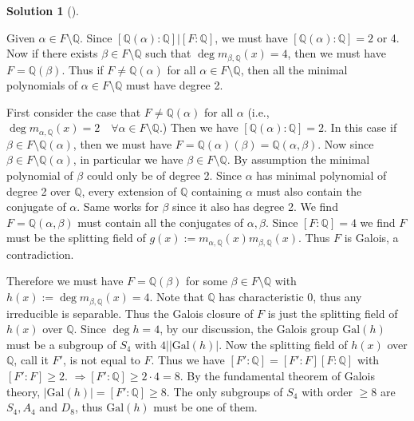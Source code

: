 \documentclass{article}
\theoremstyle{definition}
\newtheorem*{sol}{Solution}
\newenvironment{sols}[1][]{%
  \begin{sol}[#1]$ $\par\nobreak\ignorespaces
}{%
  \end{sol}
}
\newcommand{\QQ}{\mathbb Q}
\newcommand{\Ra}{\Rightarrow}
\newcommand{\Gal}{\text{Gal}}
\begin{document}
\begin{sols}
	Given $\alpha \in F \setminus \QQ$.
	Since $[\QQ(\alpha):\QQ] | [F:\QQ]$, we must have $[\QQ(\alpha):\QQ] = 2$ or 4.
	Now if there exists $\beta \in F \setminus \QQ$ such that $\deg m_{\beta, \QQ}(x) = 4$, then we must have $F = \QQ(\beta)$.
	Thus if $F \neq \QQ(\alpha)$ for all $\alpha \in F \setminus \QQ$, then all the minimal polynomials of $\alpha \in F\setminus \QQ$ must have degree 2.
	\par First consider the case that $F \neq \QQ(\alpha)$ for all $\alpha$ (i.e., $\deg m_{\alpha, \QQ}(x) = 2 \quad \forall \alpha \in F \setminus \QQ$.)
	Then we have $[\QQ(\alpha):\QQ] = 2$.
	In this case if $\beta \in F \setminus \QQ(\alpha)$, then we must have $F = \QQ(\alpha)(\beta) = \QQ(\alpha, \beta)$.
	Now since $\beta \in F \setminus \QQ(\alpha)$, in particular we have $\beta \in F \setminus \QQ$.
	By assumption the minimal polynomial of $\beta$ could only be of degree 2.
	Since $\alpha$ has minimal polynomial of degree 2 over $\QQ$, every extension of $\QQ$ containing $\alpha$ must also contain the conjugate of $\alpha$.
	Same works for $\beta$ since it also has degree 2.
	We find $F = \QQ(\alpha, \beta)$ must contain all the conjugates of $\alpha, \beta$.
	Since $[F:\QQ] = 4$ we find $F$ must be the splitting field of $g(x) := m_{\alpha, \QQ}(x) m_{\beta, \QQ}(x)$.
	Thus $F$ is Galois, a contradiction.

	\par Therefore we must have $F = \QQ(\beta)$ for some $\beta \in F\setminus \QQ$ with $h(x) := \deg m_{\beta, \QQ}(x) = 4$.
	Note that $\QQ$ has characteristic 0, thus any irreducible is separable.
	Thus the Galois closure of $F$ is just the splitting field of $h(x)$ over $\QQ$.
	Since $\deg h = 4$, by our discussion, the Galois group $\Gal(h)$ must be a subgroup of $S_4$ with $4||\Gal(h)|$.
	Now the splitting field of $h(x)$ over $\QQ$, call it $F'$, is not equal to $F$.
	Thus we have $[F':\QQ] = [F':F][F:\QQ]$ with $[F':F] \geq 2$.
	$\Ra [F':\QQ] \geq 2 \cdot 4 = 8$.
	By the fundamental theorem of Galois theory, $|\Gal(h)| = [F':\QQ] \geq 8$.
	The only subgroups of $S_4$ with order $\geq 8$ are $S_4, A_4$ and $D_8$, thus $\Gal(h)$ must be one of them.


\end{sols}
\end{document}
